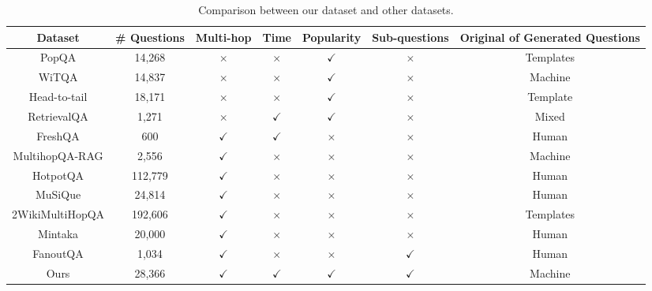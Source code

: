 \begin{table}[t]
\scriptsize
    \centering
    \begin{tabular}{c|ccccc|c}
    \hline
    Dataset& \# Questions & Multi-hop & Time & Popularity & Sub-questions & Original of Generated Questions \\
    \hline
    PopQA \cite{Mallen2022WhenNT} & 14,268 & $\times$ & $\times$ & $\checkmark$ &$\times$ & Templates \\
    WiTQA \cite{Maekawa2024RetrievalHO} & 14,837 & $\times$ & $\times$ & $\checkmark$ & $\times$ &Machine \\
    Head-to-tail \cite{Sun2023HeadtoTailHK}& 18,171 & $\times$ & $\times$ & $\checkmark$ &$\times$ & Template \\
    RetrievalQA \cite{Zhang2024RetrievalQAAA} & 1,271 & $\times$ & $\checkmark$ & $\checkmark$ & $\times$ &Mixed \\
    \hline
    FreshQA \cite{vu-etal-2024-freshllms} & 600 & $\checkmark$ & $\checkmark$ & $\times$ &$\times$ & Human \\
    MultihopQA-RAG \cite{Tang2024MultiHopRAGBR} & 2,556 & $\checkmark$ & $\times$ & $\times$ &$\times$ & Machine \\
    HotpotQA \cite{Yang2018HotpotQAAD} & 112,779 & $\checkmark$ & $\times$ & $\times$ &$\times$ & Human \\
    MuSiQue \cite{Trivedi2021MM} & 24,814 & $\checkmark$ & $\times$ & $\times$ &$\times$ & Human \\
    2WikiMultiHopQA \cite{Ho2020ConstructingAM} & 192,606 & $\checkmark$ & $\times$ & $\times$ & $\times$ &Templates \\
    Mintaka \cite{Sen2022MintakaAC} & 20,000 & $\checkmark$ & $\times$ & $\times$ & $\times$ &Human \\
    FanoutQA \cite{Zhu2024FanOutQAAM}& 1,034 & $\checkmark$ & $\times$ & $\times$ & $\checkmark$  &Human \\
    \hline
    Ours & 28,366 & $\checkmark$ & $\checkmark$ & $\checkmark$ &$\checkmark$  & Machine \\
    \hline
    \end{tabular}
\caption{Comparison between our dataset and other datasets.}
\label{data_compare}
\end{table}
